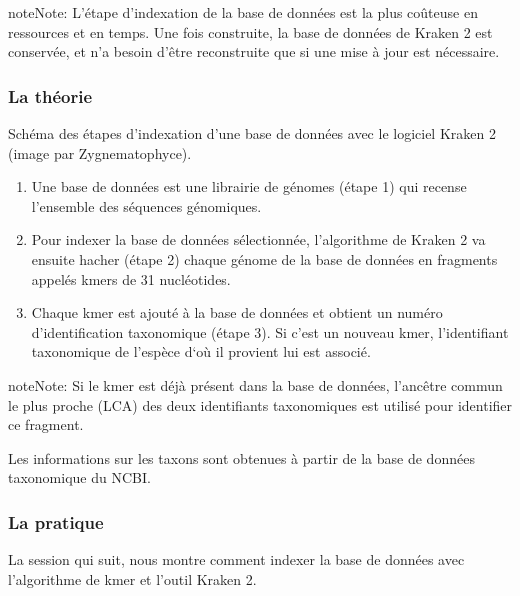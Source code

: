 \documentclass[letterpaper,10pt,french]{sphinxmanual}
\let\sphinxpxdimen\pdfpxdimen\else\newdimen\sphinxpxdimen
\begin{document}
\begin{sphinxadmonition}{note}{Note:}
L’étape d’indexation de la base de données est la plus coûteuse en ressources et en temps. Une fois construite, la base de données de Kraken 2 est conservée, et n’a besoin d’être reconstruite que si une mise à jour est nécessaire.
\end{sphinxadmonition}


\subsubsection{La théorie}
\label{\detokenize{tutorial:la-theorie}}
\noindent{\hspace*{\fill}\sphinxincludegraphics[width=400\sphinxpxdimen]{{indexation_kraken_2}.png}}

Schéma des étapes d’indexation d’une base de données avec le logiciel Kraken 2 (image par Zygnematophyce).
\begin{enumerate}
%
\item {} 
Une base de données est une librairie de génomes (étape 1) qui recense l’ensemble des séquences génomiques.

\item {} 
Pour indexer la base de données sélectionnée, l’algorithme de Kraken 2 va ensuite hacher (étape 2) chaque génome de la base de données en fragments appelés k\sphinxhyphen{}mers de 31 nucléotides.

\item {} 
Chaque k\sphinxhyphen{}mer est ajouté à la base de données et obtient un numéro d’identification taxonomique (étape 3). Si c’est un nouveau k\sphinxhyphen{}mer, l’identifiant taxonomique de l’espèce d‘où il provient lui est associé.

\end{enumerate}

\begin{sphinxadmonition}{note}{Note:}
Si le k\sphinxhyphen{}mer est déjà présent dans la base de données, l’ancêtre commun le plus proche (LCA) des deux identifiants taxonomiques est utilisé pour identifier ce fragment.
\end{sphinxadmonition}




Les informations sur les taxons sont obtenues à partir de la base de données taxonomique du NCBI.




\subsubsection{La pratique}
\label{\detokenize{tutorial:la-pratique}}
La session qui suit, nous montre comment indexer la base de données avec l’algorithme de k\sphinxhyphen{}mer et l’outil Kraken 2.
\end{document}
